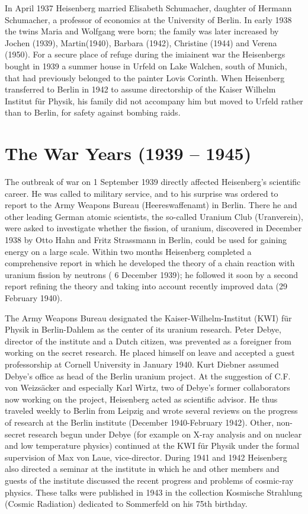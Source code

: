 \documentclass{article}
\begin{document}
In April 1937 Heisenberg married Elisabeth Schumacher, daughter of Hermann Schumacher, a professor of economics at the University of Berlin. In early 1938 the twins Maria and Wolfgang were born; the family was later increased by Jochen (1939), Martin(1940), Barbara (1942), Christine (1944) and Verena (1950). For a secure place of refuge during the imiainent war the Heisenbergs bought in 1939 a summer house in Urfeld on Lake Walchen, south of Munich, that had previously belonged to the painter Lovis Corinth. When Heisenberg transferred to Berlin in 1942 to assume directorship of the Kaiser Wilhelm Institut für Physik, his family did not accompany him but moved to Urfeld rather than to Berlin, for safety against bombing raids.

\section{The War Years (1939 – 1945)}

The outbreak of war on 1 September 1939 directly affected Heisenberg's scientific career. He was called to military service, and to his surprise was ordered to report to the Army Weapons Bureau (Heereswaffenamt) in Berlin. There he and other leading German atomic scientists, the so-called Uranium Club (Uranverein), were asked to investigate whether the fission, of uranium, discovered in December 1938 by Otto Hahn and Fritz Strassmann in Berlin, could be used for gaining energy on a large scale. Within two months Heisenberg completed a comprehensive report in which he developed the theory of a chain reaction with uranium fission by neutrons ( 6 December 1939); he followed it soon by a second report refining the theory and taking into account recently improved data (29 February 1940).

The Army Weapons Bureau designated the Kaiser-Wilhelm-Institut (KWI) für Physik in Berlin-Dahlem as the center of its uranium research. Peter Debye, director of the institute and a Dutch citizen, was prevented as a foreigner from working on the secret research. He placed himself on leave and accepted a guest professorship at Cornell University in January 1940. Kurt Diebner assumed Debye's office as head of the Berlin uranium project. At the suggestion of C.F. von Weizsäcker and especially Karl Wirtz, two of Debye's former collaborators now working on the project, Heisenberg acted as scientific advisor. He thus traveled weekly to Berlin from Leipzig and wrote several reviews on the progress of research at the Berlin institute (December 1940-February 1942). Other, non-secret research begun under Debye (for example on X-ray analysis and on nuclear and low temperature physics) continued at the KWI für Physik under the formal supervision of Max von Laue, vice-director. During 1941 and 1942 Heisenberg also directed a seminar at the institute in which he and other members and guests of the institute discussed the recent progress and problems of cosmic-ray physics. These talks were published in 1943 in the collection Kosmische Strahlung (Cosmic Radiation) dedicated to Sommerfeld on his 75th birthday.
\end{document}
